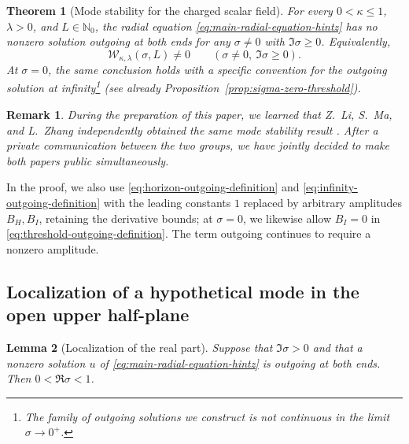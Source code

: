\documentclass[11pt]{article}
\newtheorem{rmk}{Remark}[section]
\numberwithin{equation}{section}
\newtheorem{theorem}{Theorem}[section]
\newtheorem{lemma}[theorem]{Lemma}
\begin{document}
	\begin{theorem}[Mode stability for the charged scalar field]
		\label{thm:mode-stability-charged-scalar-field}
		\label{thm:no-zeroes-upper-half-plane}
		For every $0<\kappa\leq1$, $\lambda>0$, and $L\in\mathbb N_0$,
		the radial equation \eqref{eq:main-radial-equation-hintz} has no
		nonzero solution outgoing at both ends for any $\sigma\neq0$ with
		$\Im\sigma\geq0$. Equivalently,
		\begin{equation}
			\mathcal W_{\kappa,\lambda}(\sigma,L)\neq0
			\qquad(\sigma\neq0,\ \Im\sigma\geq0).
			\label{eq:no-zeroes-nonzero-sigma}
		\end{equation}
		At $\sigma=0$, the same  conclusion holds with a specific convention for the outgoing solution at infinity\footnote{The family of outgoing solutions we construct is not continuous in the limit $\sigma \to 0^+$.} (see already  Proposition~\ref{prop:sigma-zero-threshold}).
	\end{theorem}
	
	\begin{rmk}
		During the preparation of this paper, we learned that  Z.~Li, S.~Ma, and L.~Zhang independently obtained the same mode stability result \cite{MaAl}. After a private communication between the two groups, we have jointly decided to make both papers public simultaneously.
	\end{rmk} 
	
	In the proof, we also use \eqref{eq:horizon-outgoing-definition} and
	\eqref{eq:infinity-outgoing-definition} with the leading constants $1$
	replaced by arbitrary amplitudes $B_H,B_I$, retaining the derivative
	bounds; at $\sigma=0$, we likewise allow $B_I=0$ in
	\eqref{eq:threshold-outgoing-definition}. The term outgoing continues
	to require a nonzero amplitude.
	
	
	\subsection{Localization of a hypothetical mode in the open upper half-plane}
	
	\begin{lemma}[Localization of the real part]
		\label{lem:localization-real-part}
		Suppose that $\Im\sigma>0$ and that a nonzero solution $u$ of
		\eqref{eq:main-radial-equation-hintz} is outgoing at both ends.
		Then $0<\Re\sigma<1$.
	\end{lemma}
	
\end{document}
